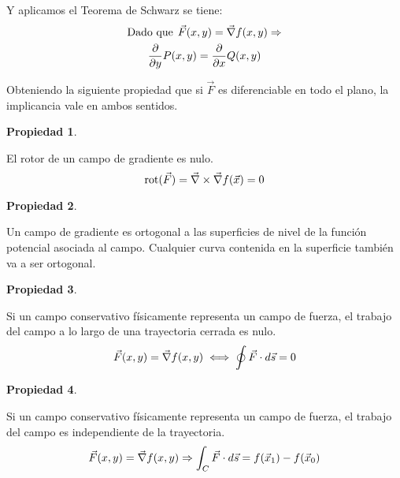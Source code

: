 \documentclass[a5paper,12pt,twoside]{book}
\newtheorem{prop}{{Propiedad}}[chapter]
\begin{document}
Y aplicamos el Teorema de Schwarz se tiene:
\begin{gather*}
    \textrm{Dado que} \hspace{1ex} \Vec{F}(x,y) = \Vec{\nabla} f(x,y) \Rightarrow
    \\
    \dfrac{\partial}{\partial y} P(x,y) = \dfrac{\partial}{\partial x} Q(x,y)
\end{gather*}
    
Obteniendo la siguiente propiedad que si $\Vec{F}$ es diferenciable en todo el plano, la implicancia vale en ambos sentidos.

\begin{mdframed}[style=MyFrame1]
    \begin{prop}
    \end{prop}
    El rotor de un campo de gradiente es nulo.
    \begin{equation*}
        \operatorname{rot}(\Vec{F})= \Vec{\nabla} \times \Vec{\nabla} f(\Vec{x}) = 0
    \end{equation*}
\end{mdframed}

\begin{mdframed}[style=MyFrame1]
    \begin{prop}
    \end{prop}
    Un campo de gradiente es ortogonal a las superficies de nivel de la función potencial asociada al campo. Cualquier curva contenida en la superficie también va a ser ortogonal.
\end{mdframed}

\begin{mdframed}[style=MyFrame1]
    \begin{prop}
    \end{prop}
    Si un campo conservativo físicamente representa un campo de fuerza, el trabajo del campo a lo largo de una trayectoria cerrada es nulo.
    \begin{equation*}
        \Vec{F}(x,y) = \Vec{\nabla} f(x,y) \iff \oint \Vec{F} \cdot d \Vec{s} = 0
    \end{equation*}
\end{mdframed}

\begin{mdframed}[style=MyFrame1]
    \begin{prop}
    \end{prop}
    Si un campo conservativo físicamente representa un campo de fuerza, el trabajo del campo es independiente de la trayectoria.
    \begin{equation*}
        \Vec{F}(x,y) = \Vec{\nabla} f(x,y) \Rightarrow \int_C \Vec{F} \cdot d \Vec{s} = f(\Vec{x}_1)-f(\Vec{x}_0)
    \end{equation*}
\end{mdframed}
\end{document}
